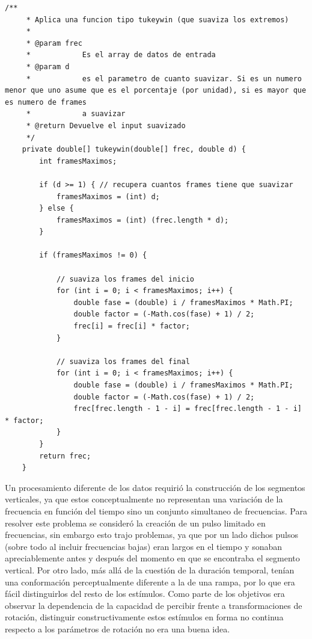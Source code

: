 \documentclass{article}
\begin{document}
	\begin{minipage}{\textwidth}
    \begin{lstlisting}[caption=Código que aplica el filtro tipo Tukey (ver figura \ref{fig:tukey}) para evitar la inclusión de armónicos por el efecto de los contornos., label=code:tukey]
     /**
	 * Aplica una funcion tipo tukeywin (que suaviza los extremos)
	 * 
	 * @param frec
	 *            Es el array de datos de entrada
	 * @param d
	 *            es el parametro de cuanto suavizar. Si es un numero menor que uno asume que es el porcentaje (por unidad), si es mayor que es numero de frames
	 *            a suavizar
	 * @return Devuelve el input suavizado
	 */
	private double[] tukeywin(double[] frec, double d) {
		int framesMaximos;

		if (d >= 1) { // recupera cuantos frames tiene que suavizar
			framesMaximos = (int) d;
		} else {
			framesMaximos = (int) (frec.length * d);
		}

		if (framesMaximos != 0) {

			// suaviza los frames del inicio
			for (int i = 0; i < framesMaximos; i++) {
				double fase = (double) i / framesMaximos * Math.PI;
				double factor = (-Math.cos(fase) + 1) / 2;
				frec[i] = frec[i] * factor;
			}

			// suaviza los frames del final
			for (int i = 0; i < framesMaximos; i++) {
				double fase = (double) i / framesMaximos * Math.PI;
				double factor = (-Math.cos(fase) + 1) / 2;
				frec[frec.length - 1 - i] = frec[frec.length - 1 - i] * factor;
			}
		}
		return frec;
	}
	\end{lstlisting}
	\end{minipage}
    
    Un procesamiento diferente de los datos requirió la construcción de los segmentos verticales, ya que estos conceptualmente no representan una variación de la frecuencia en función del tiempo sino un conjunto simultaneo de frecuencias. Para resolver este problema se consideró la creación de un pulso limitado en frecuencias, sin embargo esto trajo problemas, ya que por un lado dichos pulsos (sobre todo al incluir frecuencias bajas) eran largos en el tiempo y sonaban apreciablemente antes y después del momento en que se encontraba el segmento vertical. Por otro lado, más allá de la cuestión de la duración temporal, tenían una conformación perceptualmente diferente a la de una rampa, por lo que era fácil distinguirlos del resto de los estímulos. Como parte de los objetivos era observar la dependencia de la capacidad de percibir frente a transformaciones de rotación, distinguir constructivamente estos estímulos en forma no continua respecto a los parámetros de rotación no era una buena idea. 
    
\end{document}
